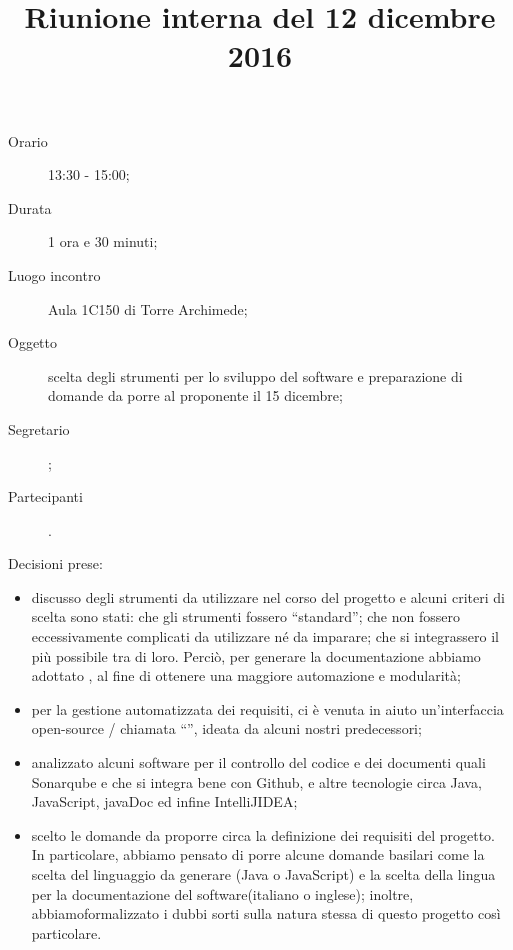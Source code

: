 


\author{\PB}
\supervisor{\MM}
\title{Riunione interna del 12 dicembre 2016}



\maketitle

\begin{description}
	\item[Orario] 13:30 - 15:00;
	\item[Durata] 1 ora e 30 minuti;
	\item[Luogo incontro] Aula 1C150 di Torre Archimede;
	\item[Oggetto] scelta degli strumenti per lo sviluppo del software e preparazione di domande da porre al proponente il 15 dicembre;
	\item[Segretario] \PB; 
	\item[Partecipanti] \ALL.
\end{description}

Decisioni prese:
\begin{itemize}
\item discusso degli strumenti da utilizzare nel corso del progetto e alcuni criteri di scelta sono stati: che gli strumenti fossero “standard”; che non fossero eccessivamente complicati da utilizzare né da imparare; che si integrassero il più possibile tra di loro. Perciò, per generare la documentazione abbiamo adottato , al fine di ottenere una maggiore automazione e modularità;
\item per la gestione automatizzata dei requisiti, ci è venuta in aiuto un'interfaccia open-source / chiamata “”, ideata da alcuni nostri predecessori;
\item analizzato alcuni software per il controllo del codice e dei documenti quali Sonarqube e  che si integra bene con Github, e altre tecnologie circa Java, JavaScript, javaDoc ed infine IntelliJIDEA;
\item scelto le domande da proporre circa la definizione dei requisiti del progetto. In particolare, abbiamo pensato di porre alcune domande basilari come la scelta del linguaggio da generare (Java o JavaScript) e la scelta della lingua per la documentazione del software(italiano o inglese); inoltre, abbiamoformalizzato i dubbi sorti sulla natura stessa di questo progetto così particolare.
\end{itemize}

